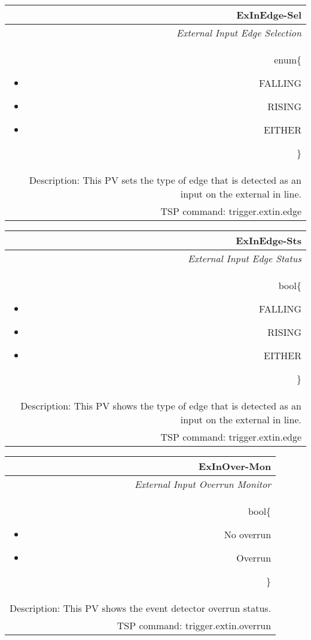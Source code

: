 \documentclass[openany]{article}
\begin{document}
		\begin{tabular}{N}
			\hline
			\bfseries ExInEdge-Sel\label{pv:exinedge-sel} \\ \hline
			\emph{External Input Edge Selection} \\
			enum\{\begin{itemize}[noitemsep]
				\small
				\item[] FALLING
				\item[] RISING
				\item[] EITHER
			\end{itemize}\} \\
			Description: This PV sets the type of edge that is detected as an input on the external in line. \\
			TSP command: trigger.extin.edge
		\end{tabular}

		\begin{tabular}{N}
			\hline
			\bfseries ExInEdge-Sts\label{pv:exinedge-sts} \\ \hline
			\emph{External Input Edge Status} \\
			bool\{\begin{itemize}[noitemsep]
				\small
				\item[] FALLING
				\item[] RISING
				\item[] EITHER
			\end{itemize}\} \\
			Description: This PV shows the type of edge that is detected as an input on the external in line. \\
			TSP command: trigger.extin.edge
		\end{tabular}

		\begin{tabular}{N}
			\hline
			\bfseries ExInOver-Mon\label{pv:exinover-mon} \\ \hline
			\emph{External Input Overrun Monitor} \\
			bool\{\begin{itemize}[noitemsep]
				\small
				\item[] No overrun
				\item[] Overrun
			\end{itemize}\} \\
			Description: This PV shows the event detector overrun status. \\
			TSP command: trigger.extin.overrun
		\end{tabular}
\end{document}
